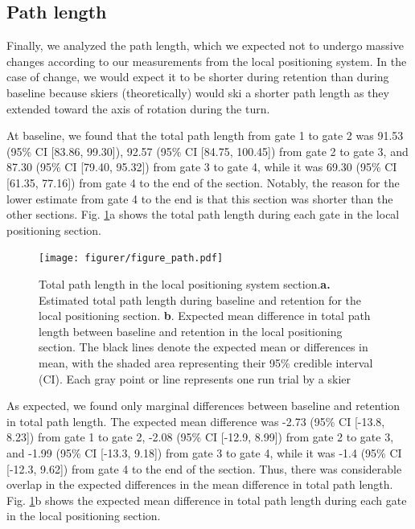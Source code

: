 \subsection{Path length}
Finally, we analyzed the path length, which we expected not to undergo massive changes according to our measurements from the local positioning system. In the case of change, we would expect it to be shorter during retention than during baseline because skiers (theoretically) would ski a shorter path length as they extended toward the axis of rotation during the turn.

At baseline, we found that the total path length from gate 1 to gate 2 was 91.53 (95\% CI [83.86, 99.30]), 92.57 (95\% CI [84.75, 100.45]) from gate 2 to gate 3, and 87.30 (95\% CI [79.40, 95.32]) from gate 3 to gate 4, while it was 69.30 (95\% CI [61.35, 77.16]) from gate 4 to the end of the section. Notably, the reason for the lower estimate from gate 4 to the end is that this section was shorter than the other sections. Fig. \ref{fig: path}a shows the total path length during each gate in the local positioning section.

\begin{figure}[H]
\centering
\texttt{[image: figurer/figure\_path.pdf]}
\caption{Total path length in the local positioning system section.\textbf{a.} Estimated total path length during baseline and retention for the local positioning section. \textbf{b}. Expected mean difference in total path length between baseline and retention in the local positioning section. The black lines denote the expected mean or differences in mean, with the shaded area representing their 95\% credible interval (CI). Each gray point or line represents one run trial by a skier}\label{fig: path}
\end{figure}

As expected, we found only marginal differences between baseline and retention in total path length. The expected mean difference was -2.73 (95\% CI [-13.8, 8.23]) from gate 1 to gate 2, -2.08 (95\% CI [-12.9, 8.99]) from gate 2 to gate 3, and -1.99 (95\% CI [-13.3, 9.18]) from gate 3 to gate 4, while it was -1.4 (95\% CI [-12.3, 9.62]) from gate 4 to the end of the section. Thus, there was considerable overlap in the expected differences in the mean difference in total path length. Fig. \ref{fig: path}b shows the expected mean difference in total path length during each gate in the local positioning section.

